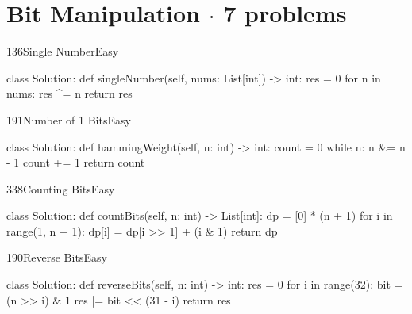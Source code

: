 \section{Bit Manipulation \texorpdfstring{{\normalsize\color{muted}$\cdot$ 7 problems}}{- 7 problems}}

\begin{problem}{136}{Single Number}{Easy}
\begin{code}
class Solution:
    def singleNumber(self, nums: List[int]) -> int:
        res = 0
        for n in nums:
            res ^= n
        return res
\end{code}
\end{problem}

\begin{problem}{191}{Number of 1 Bits}{Easy}
\begin{code}
class Solution:
    def hammingWeight(self, n: int) -> int:
        count = 0
        while n:
            n &= n - 1
            count += 1
        return count
\end{code}
\end{problem}

\begin{problem}{338}{Counting Bits}{Easy}
\begin{code}
class Solution:
    def countBits(self, n: int) -> List[int]:
        dp = [0] * (n + 1)
        for i in range(1, n + 1):
            dp[i] = dp[i >> 1] + (i & 1)
        return dp
\end{code}
\end{problem}

\begin{problem}{190}{Reverse Bits}{Easy}
\begin{code}
class Solution:
    def reverseBits(self, n: int) -> int:
        res = 0
        for i in range(32):
            bit = (n >> i) & 1
            res |= bit << (31 - i)
        return res
\end{code}
\end{problem}

